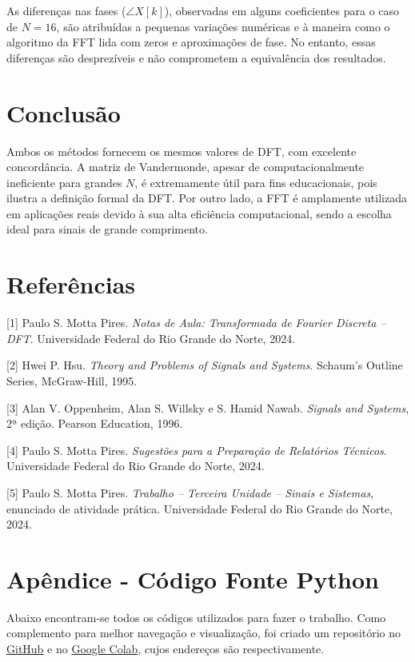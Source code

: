 \documentclass[12pt]{article}
\begin{document}
As diferenças nas fases ($\angle X[k]$), observadas em alguns coeficientes para o caso de $N=16$, são atribuídas a pequenas variações numéricas e à maneira como o algoritmo da FFT lida com zeros e aproximações de fase. No entanto, essas diferenças são desprezíveis e não comprometem a equivalência dos resultados.


\newpage
\section{Conclusão}

Ambos os métodos fornecem os mesmos valores de DFT, com excelente concordância. A matriz de Vandermonde, apesar de computacionalmente ineficiente para grandes $N$, é extremamente útil para fins educacionais, pois ilustra a definição formal da DFT. Por outro lado, a FFT é amplamente utilizada em aplicações reais devido à sua alta eficiência computacional, sendo a escolha ideal para sinais de grande comprimento.


\newpage
\section{Referências}

[1] Paulo S. Motta Pires. \textit{Notas de Aula: Transformada de Fourier Discreta -- DFT}. Universidade Federal do Rio Grande do Norte, 2024.

[2] Hwei P. Hsu. \textit{Theory and Problems of Signals and Systems}. Schaum’s Outline Series, McGraw-Hill, 1995.

[3] Alan V. Oppenheim, Alan S. Willsky e S. Hamid Nawab. \textit{Signals and Systems}, 2ª edição. Pearson Education, 1996.

[4] Paulo S. Motta Pires. \textit{Sugestões para a Preparação de Relatórios Técnicos}. Universidade Federal do Rio Grande do Norte, 2024.

[5] Paulo S. Motta Pires. \textit{Trabalho -- Terceira Unidade -- Sinais e Sistemas}, enunciado de atividade prática. Universidade Federal do Rio Grande do Norte, 2024.


\newpage
\appendix
\section{Apêndice - Código Fonte Python}
Abaixo encontram-se todos os códigos utilizados para fazer o trabalho. Como complemento para melhor navegação e visualização, foi criado um repositório no \href{https://github.com/JVitorbs/Sinais_e_Sistemas}{GitHub} e no \href{https://colab.research.google.com/drive/1kwMIIVIxUfYBJ2oYKGRkIuohxrJJVhq3?usp=sharing}{Google Colab}, cujos endereços são respectivamente.
\end{document}
